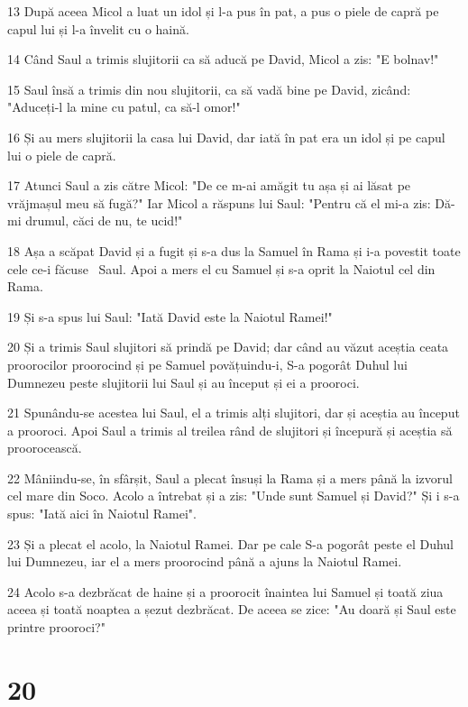 \par 13 După aceea Micol a luat un idol și l-a pus în pat, a pus o piele de capră pe capul lui și l-a învelit cu o haină.
\par 14 Când Saul a trimis slujitorii ca să aducă pe David, Micol a zis: "E bolnav!"
\par 15 Saul însă a trimis din nou slujitorii, ca să vadă bine pe David, zicând: "Aduceți-l la mine cu patul, ca să-l omor!"
\par 16 Și au mers slujitorii la casa lui David, dar iată în pat era un idol și pe capul lui o piele de capră.
\par 17 Atunci Saul a zis către Micol: "De ce m-ai amăgit tu așa și ai lăsat pe vrăjmașul meu să fugă?" Iar Micol a răspuns lui Saul: "Pentru că el mi-a zis: Dă-mi drumul, căci de nu, te ucid!"
\par 18 Așa a scăpat David și a fugit și s-a dus la Samuel în Rama și i-a povestit toate cele ce-i făcuse  Saul. Apoi a mers el cu Samuel și s-a oprit la Naiotul cel din Rama.
\par 19 Și s-a spus lui Saul: "Iată David este la Naiotul Ramei!"
\par 20 Și a trimis Saul slujitori să prindă pe David; dar când au văzut aceștia ceata proorocilor proorocind și pe Samuel povățuindu-i, S-a pogorât Duhul lui Dumnezeu peste slujitorii lui Saul și au început și ei a prooroci.
\par 21 Spunându-se acestea lui Saul, el a trimis alți slujitori, dar și aceștia au început a prooroci. Apoi Saul a trimis al treilea rând de slujitori și începură și aceștia să proorocească.
\par 22 Mâniindu-se, în sfârșit, Saul a plecat însuși la Rama și a mers până la izvorul cel mare din Soco. Acolo a întrebat și a zis: "Unde sunt Samuel și David?" Și i s-a spus: "Iată aici în Naiotul Ramei".
\par 23 Și a plecat el acolo, la Naiotul Ramei. Dar pe cale S-a pogorât peste el Duhul lui Dumnezeu, iar el a mers proorocind până a ajuns la Naiotul Ramei.
\par 24 Acolo s-a dezbrăcat de haine și a proorocit înaintea lui Samuel și toată ziua aceea și toată noaptea a șezut dezbrăcat. De aceea se zice: "Au doară și Saul este printre prooroci?"

\chapter{20}

